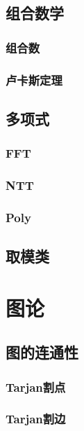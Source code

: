 \subsection{组合数学}
\subsubsection{组合数}

\subsubsection{卢卡斯定理}


\subsection{多项式}
\subsubsection{FFT}


\subsubsection{NTT}

\subsubsection{Poly}

\subsection{取模类}

\section{图论}
\subsection{图的连通性}
\subsubsection{Tarjan割点}


\subsubsection{Tarjan割边}


